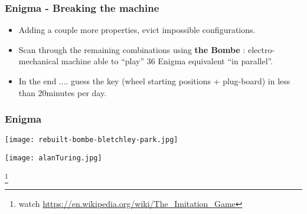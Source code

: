 \documentclass[
hyperref={pdfpagelabels=false}
,xcolor=table
]
{beamer}
\begin{document}
\begin{frame}[fragile]
  \frametitle{Enigma - Breaking the machine}

  \begin{itemize}
  \item Adding a couple more properties, evict impossible configurations. 
  \item Scan through the remaining combinations using \textbf{the Bombe} : electro-mechanical machine able to ``play'' 36 Enigma equivalent ``in parallel''. 
  \item In the end .... guess the key (wheel starting positions + plug-board) in less than 20minutes per day. 
  \end{itemize}
 
\end{frame}



\begin{frame}
    \frametitle{Enigma}
  \begin{minipage}{0.45\textwidth}
    \texttt{[image: rebuilt-bombe-bletchley-park.jpg]}
  \end{minipage}
  \hfill
  \begin{minipage}{0.45\textwidth}
    \texttt{[image: alanTuring.jpg]}
  \end{minipage}

  \footnote*{watch \url{https://en.wikipedia.org/wiki/The_Imitation_Game}}
\end{frame}
\end{document}
